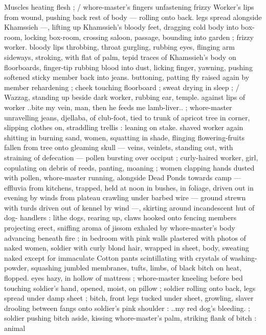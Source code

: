 Muscles heating flesh ; {\slash} whore-master's fingers unfastening frizzy 
Worker's lips from wound, pushing back rest of body --- rolling onto 
back. legs spread alongside Khamssieh ---, lifting up Khamssieh's 
bloody feet, dragging cold body into box-room, locking box-room, 
crossing saloon, passage, bounding into garden ; frizzy worker. 
bloody lips throbbing, throat gurgling, rubbing eyes, flinging arm 
sideways, stroking, with flat of palm, tepid traces of Khamssieh's 
body on floorboards, finger-tip rubbing blood into dust, licking 
finger, yawning, pushing softened sticky member back into jeans. 
buttoning, patting fly raised again by member rehardening ; cheek 
touching floorboard ; sweat drying in sleep ; {\slash} Wazzag, standing up 
beside dark worker, rubbing ear, temple. against lips of worker 
{\gl}..bite my vein, man, then he feeds me lamb-liver..{\gr} ; whore-master 
unravelling jeans, djellaba, of club-foot, tied to trunk of apricot tree 
in corner, slipping clothes on, straddling trellis : leaning on stake. 
shaved worker again shitting in burning sand, women, squatting in 
shade, flinging flowering-fruits fallen from tree onto gleaming skull 
--- veins, veinlets, standing out, with straining of defecation --- 
pollen bursting over occiput ; curly-haired worker, girl, copulating on 
debris of reeds, panting, moaning ; women clapping hands dusted 
with pollen, whore-master running, alongside {\gl} Dead Ponds {\gr} 
towards camp --- effluvia from kitchens, trapped, held at noon in 
bushes, in foliage, driven out in evening by winds from plateau 
crawling under barbed wire --- ground strewn with turds driven out 
of kennel by wind ---, skirting around incandescent hut of dog- 
handlers : lithe dogs, rearing up, claws hooked onto fencing 
members projecting erect, sniffing aroma of jissom exhaled by 
whore-master's body advancing beneath fire ; in bedroom with pink 
walls plastered with photos of naked women, soldier with curly blond 
hair, wrapped in sheet, body, sweating naked except for immaculate 
Cotton pants scintillating with crystals of washing-powder, squashing 
jumbled membranes, tufts, limbs, of black bitch on heat, flopped. 
eyes hazy, in hollow of mattress ; whore-master kneeling before bed 
touching soldier's hand, opened, moist, on pillow ; soldier rolling 
onto back, legs spread under damp sheet ; bitch, front legs tucked 
under sheet, growling, slaver drooling between fangs onto soldier's 
pink shoulder : {\td} {\gl}..my red dog's bleeding.{\gr} ; soldier pushing bitch 
aside, kissing whore-master's palm, striking flank of bitch : animal 
